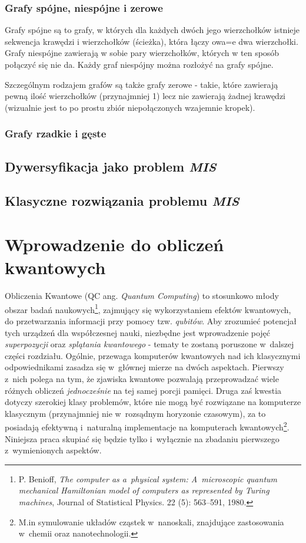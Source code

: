 \documentclass[12pt,a4paper,twoside,openany]{book}
\begin{document}
\subsection{Grafy spójne, niespójne i zerowe}
Grafy spójne są to grafy, w których dla każdych dwóch jego wierzchołków istnieje sekwencja krawędzi i wierzchołków (ścieżka), która łączy owa=e dwa wierzchołki. 
Grafy niespójne zawierają w sobie pary wierzchołków, których w ten sposób połączyć się nie da. Każdy graf niespójny można rozłożyć na grafy spójne.

Szczególnym rodzajem grafów są także grafy zerowe - takie, które zawierają pewną ilość wierzchołków (przynajmniej 1) lecz nie zawierają żadnej krawędzi (wizualnie jest to po prostu zbiór niepołączonych wzajemnie kropek).

\subsection{Grafy rzadkie i gęste}

\section{Dywersyfikacja jako problem \textit{MIS}}

\section{Klasyczne rozwiązania problemu \textit{MIS}}

\chapter{Wprowadzenie do obliczeń kwantowych}

Obliczenia Kwantowe (QC ang. \textit{Quantum Computing}) to stosunkowo młody obszar badań naukowych\footnote{P. Benioff, \textit{The computer as a~physical system: A~microscopic quantum mechanical Hamiltonian model of computers as represented by Turing machines}, Journal of Statistical Physics. 22 (5): 563–591, 1980.},  zajmujący się wykorzystaniem efektów kwantowych, do przetwarzania informacji przy pomocy tzw. \textit{qubitów}. 
Aby zrozumieć potencjał tych urządzeń dla współczesnej nauki, niezbędne jest wprowadzenie pojęć \textit{superpozycji} oraz \textit{splątania kwantowego} - tematy te zostaną poruszone w~dalszej części rozdziału.
Ogólnie, przewaga komputerów kwantowych nad ich klasycznymi odpowiednikami zasadza się w~głównej mierze na dwóch aspektach. 
Pierwszy z~nich polega na tym, że zjawiska kwantowe pozwalają przeprowadzać wiele różnych obliczeń \textit{jednocześnie} na tej samej porcji pamięci. 
Druga zaś kwestia dotyczy szerokiej klasy problemów, które nie mogą być rozwiązane na komputerze klasycznym (przynajmniej nie w~rozsądnym horyzonie czasowym), za to posiadają efektywną i~naturalną implementacje na komputerach kwantowych\footnote{M.in symulowanie układów cząstek w~nanoskali, znajdujące zastosowania w~chemii oraz nanotechnologii.}. 
Niniejsza praca skupiać się będzie tylko i~wyłącznie na zbadaniu pierwszego z~wymienionych aspektów.
\end{document}
